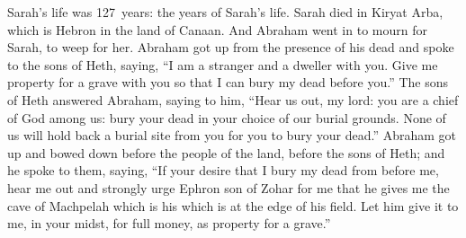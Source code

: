 
\begin{inparaenum}
     Sarah's life was 127~years: the years of Sarah's life.%
     Sarah died in Kiryat Arba, which is Hebron in the land of Canaan. And Abraham went in to mourn for Sarah, to weep for her.%
     Abraham got up from the presence of his dead and spoke to the sons of Heth, saying,%
     ``I am a stranger and a dweller with you. Give me property for a grave with you so that I can bury my dead before you.''%
     The sons of Heth answered Abraham, saying to him,%
     ``Hear us out, my lord: you are a chief of God among us: bury your dead in your choice of our burial grounds. None of us will hold back a burial site from you for you to bury your dead.''%
     Abraham got up and bowed down before the people of the land, before the sons of Heth;%
     and he spoke to them, saying, ``If your desire that I bury my dead from before me, hear me out and strongly urge Ephron son of Zohar for me%
     that he gives me the cave of Machpelah which is his which is at the edge of his field. Let him give it to me, in your midst, for full money, as property for a grave.''%
\end{inparaenum}
